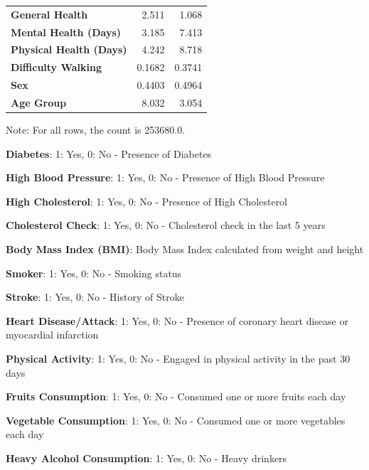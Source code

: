 \documentclass[11pt]{article}
\begin{document}
\begin{table}[h]
\begin{threeparttable}
{\begin{tabular}{lrr}
\textbf{General Health} & \raisebox{2ex}{\hypertarget{A14a}{}}2.511 & \raisebox{2ex}{\hypertarget{A14b}{}}1.068 \\
\textbf{Mental Health (Days)} & \raisebox{2ex}{\hypertarget{A15a}{}}3.185 & \raisebox{2ex}{\hypertarget{A15b}{}}7.413 \\
\textbf{Physical Health (Days)} & \raisebox{2ex}{\hypertarget{A16a}{}}4.242 & \raisebox{2ex}{\hypertarget{A16b}{}}8.718 \\
\textbf{Difficulty Walking} & \raisebox{2ex}{\hypertarget{A17a}{}}0.1682 & \raisebox{2ex}{\hypertarget{A17b}{}}0.3741 \\
\textbf{Sex} & \raisebox{2ex}{\hypertarget{A18a}{}}0.4403 & \raisebox{2ex}{\hypertarget{A18b}{}}0.4964 \\
\textbf{Age Group} & \raisebox{2ex}{\hypertarget{A19a}{}}8.032 & \raisebox{2ex}{\hypertarget{A19b}{}}3.054 \\
\bottomrule
\end{tabular}}
\begin{tablenotes}
\footnotesize
\item Note: For all rows, the count is 253680.0.
\item \textbf{Diabetes}: 1: Yes, 0: No - Presence of Diabetes
\item \textbf{High Blood Pressure}: 1: Yes, 0: No - Presence of High Blood Pressure
\item \textbf{High Cholesterol}: 1: Yes, 0: No - Presence of High Cholesterol
\item \textbf{Cholesterol Check}: 1: Yes, 0: No - Cholesterol check in the last 5 years
\item \textbf{Body Mass Index (BMI)}: Body Mass Index calculated from weight and height
\item \textbf{Smoker}: 1: Yes, 0: No - Smoking status
\item \textbf{Stroke}: 1: Yes, 0: No - History of Stroke
\item \textbf{Heart Disease/Attack}: 1: Yes, 0: No - Presence of coronary heart disease or myocardial infarction
\item \textbf{Physical Activity}: 1: Yes, 0: No - Engaged in physical activity in the past 30 days
\item \textbf{Fruits Consumption}: 1: Yes, 0: No - Consumed one or more fruits each day
\item \textbf{Vegetable Consumption}: 1: Yes, 0: No - Consumed one or more vegetables each day
\item \textbf{Heavy Alcohol Consumption}: 1: Yes, 0: No - Heavy drinkers

\end{tablenotes}
\end{threeparttable}
\end{table}
\end{document}
